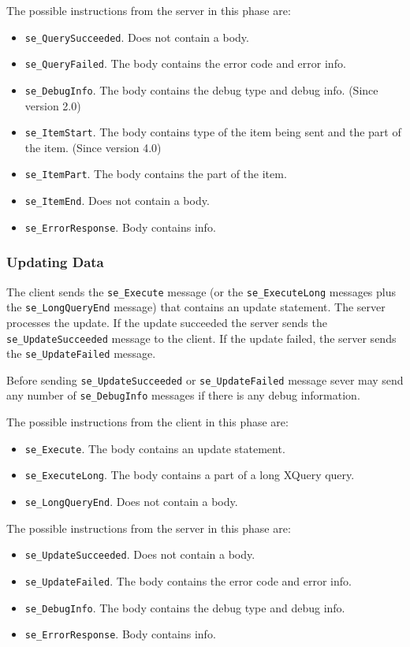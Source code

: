 \documentclass[a4paper,12pt]{article}
\newenvironment{citemize}
{\begin{itemize}
  \setlength{\itemsep}{0pt}
  \setlength{\parskip}{0pt}
  \setlength{\parsep}{0pt}}
{\end{itemize}}
\begin{document}
The possible instructions from the server in this phase are:
\begin{citemize}
\item \verb!se_QuerySucceeded!. Does not contain a body.
\item \verb!se_QueryFailed!. The body contains the error code and error info.
\item \verb!se_DebugInfo!. The body contains the debug type and debug info.
(Since version 2.0)
\item \verb!se_ItemStart!. The body contains type of the item being sent and the
part of the item. (Since version 4.0)
\item \verb!se_ItemPart!. The body contains the part of the item.
\item \verb!se_ItemEnd!. Does not contain a body.
\item \verb!se_ErrorResponse!. Body contains info.
\end{citemize}

\subsubsection{Updating Data}

The client sends the \verb!se_Execute! message (or the \verb!se_ExecuteLong!
messages plus the \verb!se_LongQueryEnd! message) that contains an update
statement. The server processes the update. If the update succeeded the server
sends the \verb!se_UpdateSucceeded! message to the client. If the update failed,
the server sends the \verb!se_UpdateFailed! message.

Before sending \verb!se_UpdateSucceeded! or \verb!se_UpdateFailed! message sever
may send any number of \verb!se_DebugInfo! messages if there is any debug
information.

The possible instructions from the client in this phase are:
\begin{citemize}
\item \verb!se_Execute!. The body contains an update statement.
\item \verb!se_ExecuteLong!. The body contains a part of a long XQuery query.
\item \verb!se_LongQueryEnd!. Does not contain a body.
\end{citemize}

The possible instructions from the server in this phase are:
\begin{citemize}
\item \verb!se_UpdateSucceeded!. Does not contain a body.
\item \verb!se_UpdateFailed!. The body contains the error code and error info.
\item \verb!se_DebugInfo!. The body contains the debug type and debug info.
\item \verb!se_ErrorResponse!. Body contains info.
\end{citemize}
\end{document}

